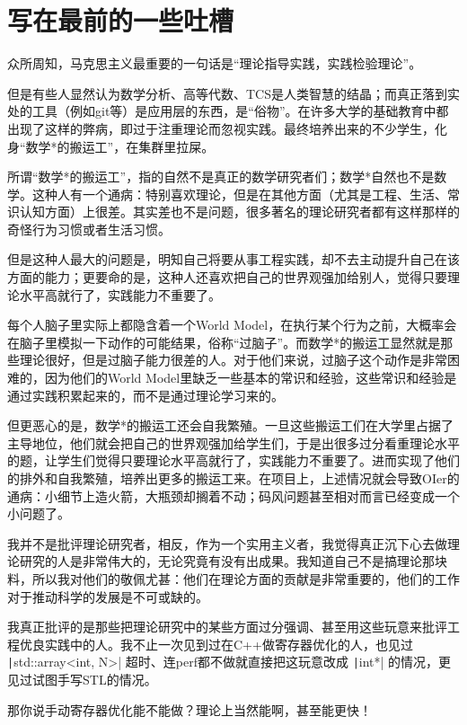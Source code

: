 \chapter{写在最前的一些吐槽}

众所周知，马克思主义最重要的一句话是“理论指导实践，实践检验理论”。

但是有些人显然认为数学分析、高等代数、TCS是人类智慧的结晶；而真正落到实处的工具（例如git等）是应用层的东西，是“俗物”。在许多大学的基础教育中都出现了这样的弊病，即过于注重理论而忽视实践。最终培养出来的不少学生，化身“数学*的搬运工”，在集群里拉屎。

所谓“数学*的搬运工”，指的自然不是真正的数学研究者们；数学*自然也不是数学。这种人有一个通病：特别喜欢理论，但是在其他方面（尤其是工程、生活、常识认知方面）上很差。其实差也不是问题，很多著名的理论研究者都有这样那样的奇怪行为习惯或者生活习惯。

但是这种人最大的问题是，明知自己将要从事工程实践，却不去主动提升自己在该方面的能力；更要命的是，这种人还喜欢把自己的世界观强加给别人，觉得只要理论水平高就行了，实践能力不重要了。

每个人脑子里实际上都隐含着一个World Model，在执行某个行为之前，大概率会在脑子里模拟一下动作的可能结果，俗称“过脑子”。而数学*的搬运工显然就是那些理论很好，但是过脑子能力很差的人。对于他们来说，过脑子这个动作是非常困难的，因为他们的World Model里缺乏一些基本的常识和经验，这些常识和经验是通过实践积累起来的，而不是通过理论学习来的。

但更恶心的是，数学*的搬运工还会自我繁殖。一旦这些搬运工们在大学里占据了主导地位，他们就会把自己的世界观强加给学生们，于是出很多过分看重理论水平的题，让学生们觉得只要理论水平高就行了，实践能力不重要了。进而实现了他们的排外和自我繁殖，培养出更多的搬运工来。在项目上，上述情况就会导致OIer的通病：小细节上造火箭，大瓶颈却搁着不动；码风问题甚至相对而言已经变成一个小问题了。

我并不是批评理论研究者，相反，作为一个实用主义者，我觉得真正沉下心去做理论研究的人是非常伟大的，无论究竟有没有出成果。我知道自己不是搞理论那块料，所以我对他们的敬佩尤甚：他们在理论方面的贡献是非常重要的，他们的工作对于推动科学的发展是不可或缺的。

我真正批评的是那些把理论研究中的某些方面过分强调、甚至用这些玩意来批评工程优良实践中的人。我不止一次见到过在C++做寄存器优化的人，也见过 \texttt|std::array<int, N>| 超时、连perf都不做就直接把这玩意改成 \texttt|int*| 的情况，更见过试图手写STL的情况。

那你说手动寄存器优化能不能做？理论上当然能啊，甚至能更快！

